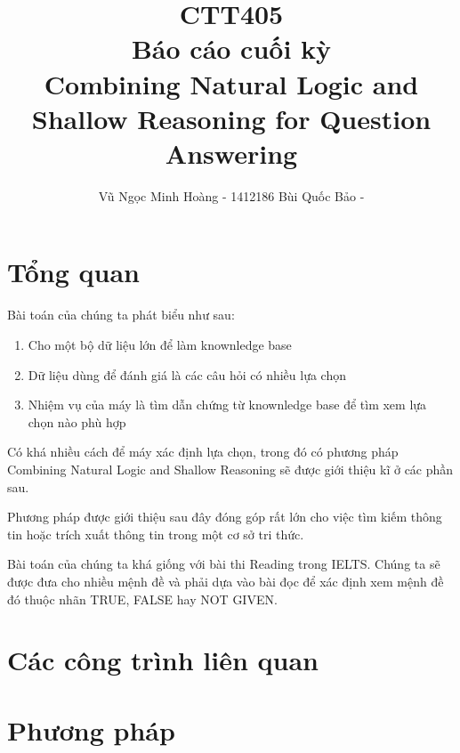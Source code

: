 \documentclass[a4paper]{article}
\begin{document}
\title{CTT405\\
Báo cáo cuối kỳ\\[1cm]
Combining Natural Logic and Shallow Reasoning for Question Answering
}
\author{Vũ Ngọc Minh Hoàng - 1412186
Bùi Quốc Bảo - }
\maketitle


\tableofcontents
{}

\clearpage

\section{Tổng quan}
Bài toán của chúng ta phát biểu như sau:
\begin{enumerate}
\item Cho một bộ dữ liệu lớn để làm knownledge base
\item Dữ liệu dùng để đánh giá là các câu hỏi có nhiều lựa chọn
\item Nhiệm vụ của máy là tìm dẫn chứng từ knownledge base để tìm xem lựa chọn nào phù hợp
\end{enumerate}
Có khá nhiều cách để máy xác định lựa chọn, trong đó có phương pháp Combining Natural Logic and Shallow Reasoning sẽ được giới thiệu kĩ ở các phần sau.


Phương pháp được giới thiệu sau đây đóng góp rất lớn cho việc tìm kiếm thông tin hoặc trích xuất thông tin trong một cơ sở tri thức.

Bài toán của chúng ta khá giống với bài thi Reading trong IELTS. Chúng ta sẽ được đưa cho nhiều mệnh đề và phải dựa vào bài đọc để xác định xem mệnh đề đó thuộc nhãn TRUE, FALSE hay NOT GIVEN.
\section{Các công trình liên quan}

\section{Phương pháp}
\end{document}
